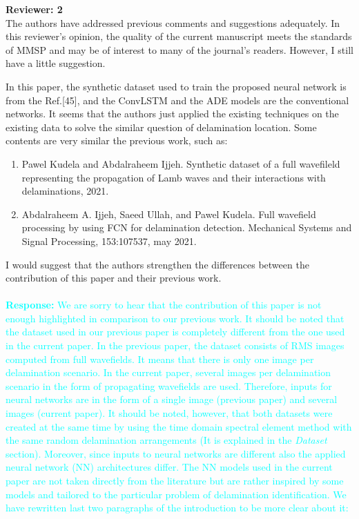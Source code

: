 \documentclass[11pt,a2paper]{report}
\begin{document}
	\newpage 
	\textbf{Reviewer: 2}\\
	The authors have addressed previous comments and suggestions adequately. 
	In this reviewer's opinion, the quality of the current manuscript meets the standards of MMSP and may be of interest to many of the journal's readers. However, I still have a little suggestion.
	 
	In this paper, the synthetic dataset used to train the proposed neural network is from the Ref.[45], and the ConvLSTM and the ADE models are the conventional networks. 
	It seems that the authors just applied the existing techniques on the existing data to solve the similar question of delamination location. 
	Some contents are very similar the previous work, such as:
	\begin{enumerate}
		\item Pawel Kudela and Abdalraheem Ijjeh. Synthetic dataset of a full wavefileld representing the propagation of Lamb waves and their interactions with delaminations, 2021. 
		\item Abdalraheem A. Ijjeh, Saeed Ullah, and Pawel Kudela. Full wavefield processing by using FCN for delamination detection. Mechanical Systems and Signal Processing, 153:107537, may 2021.
	\end{enumerate}

	I would suggest that the authors strengthen the differences between the contribution of this paper and their previous work.
	\\ \\ 
	\textcolor{Cyan}{
		\textbf{Response:}
	We are sorry to hear that the contribution of this paper is not enough highlighted in comparison to our previous work. It should be noted that the dataset used in our previous paper is completely different from the one used in the current paper. In the previous paper, the dataset consists of RMS images computed from full wavefields. It means that there is only one image per delamination scenario. In the current paper, several images per delamination scenario in the form of propagating wavefields are used. Therefore, inputs for neural networks are in the form of a single image (previous paper) and several images (current paper). It should be noted, however, that both datasets were created at the same time by using the time domain spectral element method with the same random delamination arrangements (It is explained in the \emph{Dataset} section).
	Moreover, since inputs to neural networks are different also the applied neural network (NN) architectures differ. The NN models used in the current paper are not taken directly from the literature but are rather inspired by some models and tailored to the particular problem of delamination identification.
	We have rewritten last two paragraphs of the introduction to be more clear about it:
    }
\end{document}
